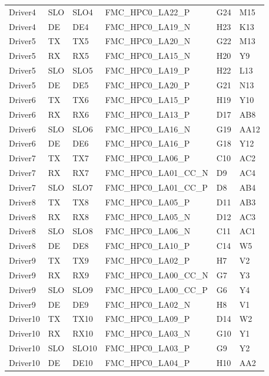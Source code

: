 {\begin{longtable}{llllll}
    Driver4 & SLO & SLO4  & FMC\_HPC0\_LA22\_P      & G24 & M15  \\
    Driver4 & DE  & DE4   & FMC\_HPC0\_LA19\_N      & H23 & K13  \\
    Driver5 & TX  & TX5   & FMC\_HPC0\_LA20\_N      & G22 & M13  \\
    Driver5 & RX  & RX5   & FMC\_HPC0\_LA15\_N      & H20 & Y9   \\
    Driver5 & SLO & SLO5  & FMC\_HPC0\_LA19\_P      & H22 & L13  \\
    Driver5 & DE  & DE5   & FMC\_HPC0\_LA20\_P      & G21 & N13  \\
    Driver6 & TX  & TX6   & FMC\_HPC0\_LA15\_P      & H19 & Y10  \\
    Driver6 & RX  & RX6   & FMC\_HPC0\_LA13\_P      & D17 & AB8  \\
    Driver6 & SLO & SLO6  & FMC\_HPC0\_LA16\_N      & G19 & AA12 \\
    Driver6 & DE  & DE6   & FMC\_HPC0\_LA16\_P      & G18 & Y12  \\
    Driver7 & TX  & TX7   & FMC\_HPC0\_LA06\_P      & C10 & AC2  \\
    Driver7 & RX  & RX7   & FMC\_HPC0\_LA01\_CC\_N  & D9  & AC4  \\
    Driver7 & SLO & SLO7  & FMC\_HPC0\_LA01\_CC\_P  & D8  & AB4  \\
    Driver8 & TX  & TX8   & FMC\_HPC0\_LA05\_P      & D11 & AB3  \\
    Driver8 & RX  & RX8   & FMC\_HPC0\_LA05\_N      & D12 & AC3  \\
    Driver8 & SLO & SLO8  & FMC\_HPC0\_LA06\_N      & C11 & AC1  \\
    Driver8 & DE  & DE8   & FMC\_HPC0\_LA10\_P      & C14 & W5   \\
    Driver9 & TX  & TX9   & FMC\_HPC0\_LA02\_P      & H7  & V2   \\
    Driver9 & RX  & RX9   & FMC\_HPC0\_LA00\_CC\_N  & G7  & Y3   \\
    Driver9 & SLO & SLO9  & FMC\_HPC0\_LA00\_CC\_P  & G6  & Y4   \\
    Driver9 & DE  & DE9   & FMC\_HPC0\_LA02\_N      & H8  & V1   \\
    Driver10 & TX  & TX10  & FMC\_HPC0\_LA09\_P     & D14 & W2   \\
    Driver10 & RX  & RX10  & FMC\_HPC0\_LA03\_N     & G10 & Y1   \\
    Driver10 & SLO & SLO10 & FMC\_HPC0\_LA03\_P     & G9  & Y2   \\
    Driver10 & DE  & DE10  & FMC\_HPC0\_LA04\_P     & H10 & AA2  \\

\end{longtable}}
